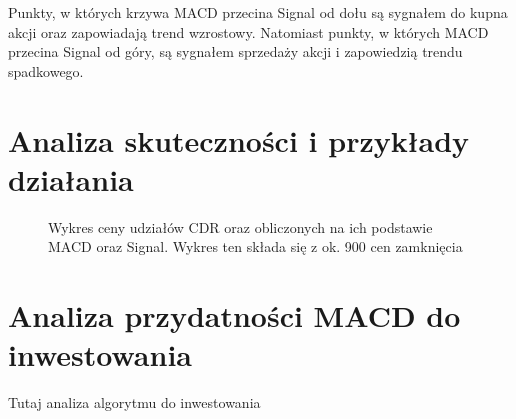 \documentclass{article}
\begin{document}
    Punkty, w których krzywa MACD przecina Signal od dołu są sygnałem do kupna akcji oraz zapowiadają trend wzrostowy.
    Natomiast punkty, w których MACD przecina Signal od góry, są sygnałem sprzedaży akcji i zapowiedzią trendu spadkowego. 

\section{Analiza skuteczności i przykłady działania}
    \begin{figure}[!htb]
        \noindent{}
        \caption{Wykres ceny udziałów CDR oraz obliczonych na ich podstawie MACD oraz Signal. Wykres ten składa się z ok. 900 cen zamknięcia}
    \end{figure}

    

\section{Analiza przydatności MACD do inwestowania}

    Tutaj analiza algorytmu do inwestowania
\end{document}
